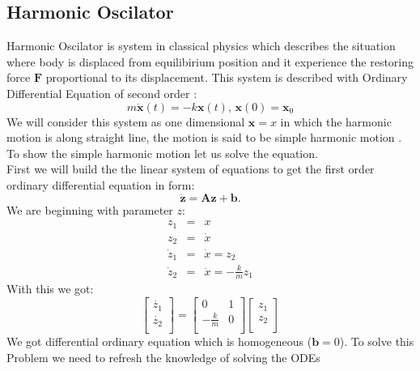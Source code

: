 \subsection{Harmonic Oscilator}
Harmonic Oscilator is  system  in classical physics which describes the situation where body is displaced from equilibirium position and it experience the restoring force $\mathbf{F}$ proportional to its displacement.\cite{} This system is described with Ordinary Differential Equation of second order : 
\begin{equation}
	m\ddot{\mathbf{x}}(t) = -k\mathbf{x}(t) \texttt{,   } \mathbf{x}(0)= \mathbf{x}_0
\end{equation}
We will consider this system as one dimensional $\mathbf{x}= x$
in which the harmonic motion is along straight line, the motion is said to be simple harmonic motion \cite{osci}. To show the simple harmonic motion let us solve the equation.\\
First we will build the the linear system of equations to get the first order ordinary differential equation in form: \begin{equation}
	\ddot{\mathbf{z}}= \mathbf{A}\mathbf{z} + \mathbf{b}.
\end{equation}
We are beginning with parameter $z$:
\begin{eqnarray}
	z_1 &=& x\\
	z_2 &=& \dot{x}\\
	\dot{z}_1 &=& \dot{x} = z_2\\
	\dot{z}_2 &=& \ddot{x} = -\frac{k}{m}z_1 
\end{eqnarray}
With this we got:
\begin{equation}
	\begin{bmatrix}
		\dot{z_1}\\
		\dot{z_2}\\
	\end{bmatrix} = \begin{bmatrix}
	0 & 1\\
	-\frac{k}{m} & 0\\
	\end{bmatrix}
	\begin{bmatrix}
		z_1\\
		z_2\\
	\end{bmatrix}
\end{equation}
We got differential ordinary equation which is homogeneous ($\mathbf{b}=0$). To solve this Problem we need to refresh the knowledge of solving the ODEs 

